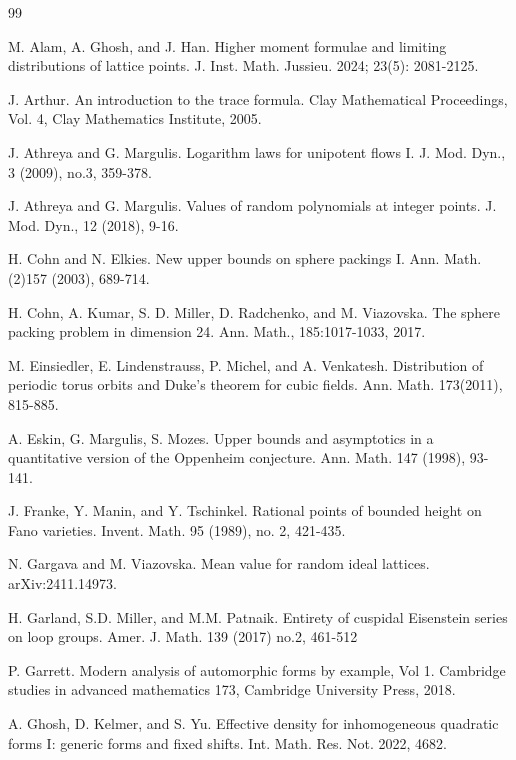 \documentclass[11pt]{amsart}
\numberwithin{theorem}{section}
\numberwithin{equation}{section}
\theoremstyle{remark}
\theoremstyle{definition}
\begin{document}
\begin{thebibliography}{99}

 M. Alam, A. Ghosh, and J. Han. Higher moment formulae and limiting distributions of lattice points. J. Inst. Math. Jussieu. 2024; 23(5): 2081-2125.

 J. Arthur. An introduction to the trace formula. Clay Mathematical Proceedings, Vol. 4, Clay Mathematics Institute, 2005.

 J. Athreya and G. Margulis. Logarithm laws for unipotent flows I. J. Mod. Dyn., 3 (2009), no.3, 359-378.

 J. Athreya and G. Margulis. Values of random polynomials at integer points. J. Mod. Dyn., 12 (2018), 9-16.

 H. Cohn and N. Elkies. New upper bounds on sphere packings I. Ann. Math. (2)157 (2003), 689-714.

 H. Cohn, A. Kumar, S. D. Miller, D. Radchenko, and M. Viazovska. The sphere packing problem in
dimension 24. Ann. Math., 185:1017-1033, 2017.

 M. Einsiedler, E. Lindenstrauss, P. Michel, and A. Venkatesh. Distribution of periodic torus orbits and Duke's theorem for cubic fields. Ann. Math. 173(2011), 815-885.

 A. Eskin, G. Margulis, S. Mozes. Upper bounds and asymptotics in a quantitative version of the Oppenheim conjecture. Ann. Math. 147 (1998), 93-141.

 J. Franke, Y. Manin, and Y. Tschinkel. Rational points of bounded height on Fano varieties. Invent. Math. 95 (1989), no. 2, 421-435.

 N. Gargava and M. Viazovska. Mean value for random ideal lattices. arXiv:2411.14973.

 H. Garland, S.D. Miller, and M.M. Patnaik. Entirety of cuspidal Eisenstein series on loop groups. Amer. J. Math. 139 (2017) no.2, 461-512

 P. Garrett. Modern analysis of automorphic forms by example, Vol 1. Cambridge studies in advanced mathematics 173, Cambridge University Press, 2018.

 A. Ghosh, D. Kelmer, and S. Yu. Effective density for inhomogeneous quadratic forms I: generic forms and fixed shifts. Int. Math. Res. Not. 2022, 4682.


\end{thebibliography}
\end{document}
